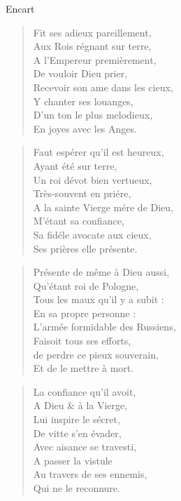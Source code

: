 \begin{diary}{Encart}{}
        \begin{verse}Fit ses adieux pareillement,\\Aux Rois régnant sur terre,\\A l'Empereur
                                 premièrement,\\De vouloir Dieu prier,\\Recevoir son ame dans les cieux,\\Y chanter ses louanges,\\D'un ton le plus melodieux,\\En joyes avec les Anges.\\\end{verse}
        \bigskip

        \begin{verse}Faut espérer qu'il est heureux,\\Ayant été sur terre,\\Un roi dévot bien
                                 vertueux,\\Très-souvent en priére,\\A la sainte Vierge mére de Dieu,\\M’étant sa confiance,\\Sa fidéle avocate aux cieux,\\Ses prières elle présente.\\\end{verse}
        \bigskip

        \begin{verse}Présente de même à Dieu aussi,\\Qu’étant roi de Pologne,\\Tous les maux qu’il y a subit :\\En sa propre personne :\\L'armée formidable des Russiens,\\Faisoit tous ses efforts,\\de perdre ce pieux souverain,\\Et de le mettre à mort.\\\end{verse}
        \bigskip

        \begin{verse}La confiance qu'il avoit,\\A Dieu \& à la Vierge,\\Lui inspire le sécret,\\De vitte s'en évader,\\Avec aisance se travesti,\\A passer la vistule\\Au travers de ses ennemis,\\Qui ne le reconnure.\\\end{verse}
        \bigskip


\end{diary}
